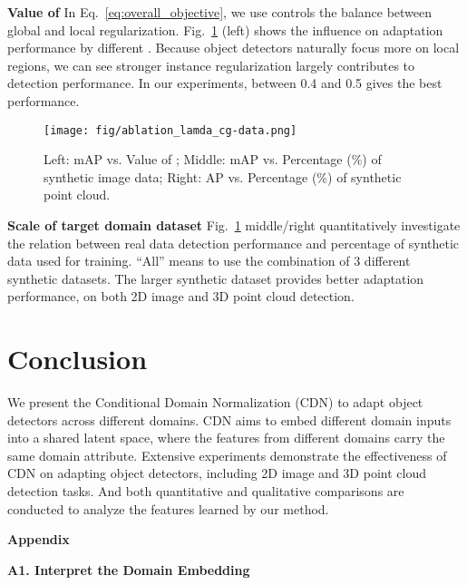 \documentclass[runningheads]{llncs}
\begin{document}
\textbf{Value of }
In Eq.~\ref{eq:overall_objective}, we use  controls the balance between global and local regularization.
Fig.~\ref{fig:ablation-lamda-cg} (left) shows the influence on adaptation performance by different .
Because object detectors naturally focus more on local regions, we can see stronger instance regularization largely contributes to detection performance.
In our experiments,  between 0.4 and 0.5 gives the best performance.

\begin{figure}
    \centering
    \texttt{[image: fig/ablation\_lamda\_cg-data.png]}
    \caption{Left: mAP vs. Value of ; Middle:  mAP vs. Percentage (\%) of synthetic image data;  Right:  AP vs. Percentage (\%) of synthetic point cloud.}
    \label{fig:ablation-lamda-cg}
\end{figure}


\textbf{Scale of target domain dataset}
Fig.~\ref{fig:ablation-lamda-cg} middle/right quantitatively investigate the relation between real data detection performance and percentage of synthetic data used for training.
``All''  means to use the combination of 3 different synthetic datasets. The larger synthetic dataset provides better adaptation performance, on both 2D image and 3D point cloud detection.


\section{Conclusion}
We present the Conditional Domain Normalization (CDN) to adapt object detectors across different domains.
CDN aims to embed different domain inputs into a shared latent space, where the features from different domains carry the same domain attribute.
Extensive experiments demonstrate the effectiveness of CDN on adapting object detectors,  including  2D image and 3D point cloud detection tasks.
And both quantitative and qualitative comparisons are conducted to analyze the features learned by our method.



\vspace{30pt}
\noindent \textbf{\Large Appendix}
\vspace{8pt}

\noindent  \textbf{A1. Interpret the  Domain Embedding}
\end{document}
